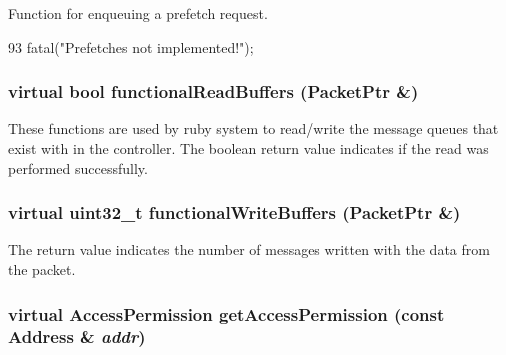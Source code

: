 Function for enqueuing a prefetch request. 


\begin{DoxyCode}
93     { fatal("Prefetches not implemented!");}
\end{DoxyCode}
\hypertarget{classAbstractController_ab4c57c1f46545be8cb011b32d4949330}{
\subsubsection[{functionalReadBuffers}]{\setlength{\rightskip}{0pt plus 5cm}virtual bool functionalReadBuffers ({\bf PacketPtr} \&)}}
\label{classAbstractController_ab4c57c1f46545be8cb011b32d4949330}
These functions are used by ruby system to read/write the message queues that exist with in the controller. The boolean return value indicates if the read was performed successfully. \hypertarget{classAbstractController_a87a5fc3e2b5c5e1813ed7ed3ef1689ae}{
\subsubsection[{functionalWriteBuffers}]{\setlength{\rightskip}{0pt plus 5cm}virtual {\bf uint32\_\-t} functionalWriteBuffers ({\bf PacketPtr} \&)}}
\label{classAbstractController_a87a5fc3e2b5c5e1813ed7ed3ef1689ae}
The return value indicates the number of messages written with the data from the packet. \hypertarget{classAbstractController_ab14bc832dc06fbcb264f043d44a8915c}{
\subsubsection[{getAccessPermission}]{\setlength{\rightskip}{0pt plus 5cm}virtual AccessPermission getAccessPermission (const {\bf Address} \& {\em addr})}}
